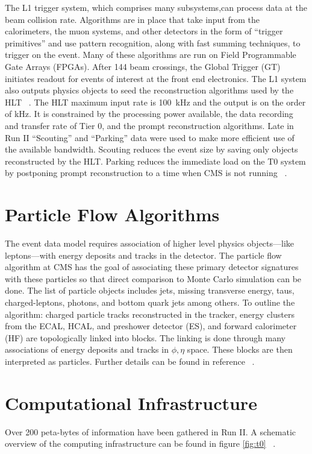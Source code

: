 The L1 trigger system, which comprises many subsystems,can process data at the beam collision rate. Algorithms are in place that take input from the calorimeters, the muon systems, and other detectors in the form of ``trigger primitives'' and use pattern recognition, along with fast summing techniques, to trigger on the event. Many of these algorithms are run on Field Programmable Gate Arrays (FPGAs). 
After 144 beam crossings, the Global Trigger (GT) initiates readout for events of interest at the front end electronics. 
 The L1 system also outputs physics objects to seed the reconstruction algorithms used by the HLT ~\cite{Foudas:2232067}. 
The HLT maximum input rate is 100~kHz and the output is on the order of kHz. It is constrained by the processing power available, the data recording and transfer rate of Tier 0, and the prompt reconstruction algorithms. Late in Run II  ``Scouting'' and ``Parking'' data were used to make more efficient use of the available bandwidth. Scouting reduces the event size by saving only objects reconstructed by the HLT. Parking reduces the immediate load on the T0 system by postponing prompt reconstruction to a time when CMS is not running ~\cite{Thomas:2703017}.


\section{Particle Flow Algorithms}
The event data model requires association of higher level physics objects---like leptons---with energy deposits and tracks in the detector. 
The particle flow algorithm at CMS has the goal of associating these primary detector signatures with these particles so that direct comparison to Monte Carlo simulation can be done. 
The list of particle objects includes jets, missing transverse energy, taus, charged-leptons, photons, and bottom quark jets among others.
To outline the algorithm: charged particle tracks reconstructed in the tracker, energy clusters from the ECAL, HCAL, and preshower detector (ES), and forward calorimeter (HF) are topologically linked into blocks. The linking is done through many associations of energy deposits and tracks in $\phi,\eta$ space. These blocks are then interpreted as particles. Further details can be found in reference ~\cite{CMS-PAS-PFT-10-001}.

\section{Computational Infrastructure}
Over 200 peta-bytes of information have been gathered in Run II. A schematic overview of the computing infrastructure can be found in figure \ref{fig:t0} ~\cite{Hufnagel:1319049}.

